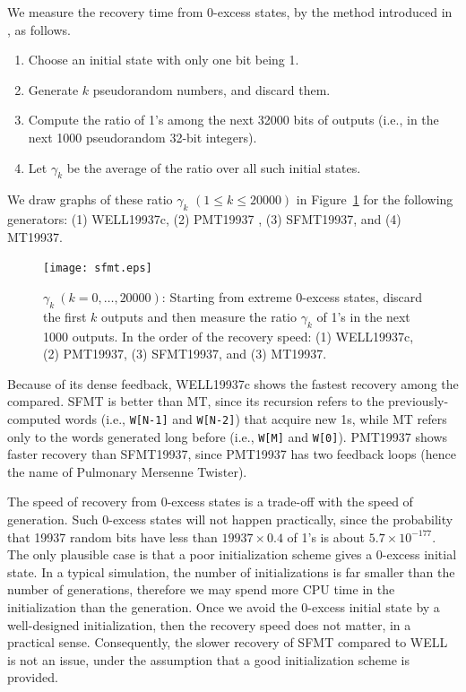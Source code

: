 \documentclass[acmnow]{acmtrans2m}
\begin{document}
We measure the recovery time from 0-excess states, 
by the method introduced in \cite{WELL}, as follows.
\begin{enumerate}
\item Choose an initial state with only one bit being 1.
\item Generate $k$ pseudorandom numbers, and discard them.
\item Compute the ratio of 1's among the 
next 32000 bits of outputs
(i.e., in the next 1000 pseudorandom 32-bit integers).
\item Let $\gamma_k$ be the average of the ratio over
all such initial states.
\end{enumerate}
We draw graphs of these ratio $\gamma_k$ $(1 \leq k \leq 20000)$
in Figure~\ref{fig:zero-recovery}
for the following generators: (1) WELL19937c, 
(2) PMT19937 \cite{PMT}, (3) SFMT19937, and (4) MT19937. 
\begin{figure}
\texttt{[image: sfmt.eps]}
\caption{$\gamma_k \ (k=0,\ldots,20000)$:
Starting from extreme 0-excess states,
discard the first $k$ outputs and then measure
the ratio $\gamma_k$ of 1's in the next 1000 outputs. 
In the order of the recovery speed: 
(1) WELL19937c, 
(2) PMT19937, (3) SFMT19937, and (3) MT19937.
}\label{fig:zero-recovery}
\end{figure}
Because of its dense feedback, WELL19937c shows
the fastest recovery among the compared. 
SFMT is better than MT, since its recursion refers to 
the previously-computed words (i.e., {\tt W[N-1]} and {\tt W[N-2]}) 
that acquire new 1s, while
MT refers only to the words generated long before 
(i.e., {\tt W[M]} and {\tt W[0]}). PMT19937 shows faster recovery 
than SFMT19937, since PMT19937 has two feedback loops
(hence the name of Pulmonary Mersenne Twister).

The speed of recovery from 0-excess states 
is a trade-off 
with the speed of generation. 
Such 0-excess states will not happen practically, 
since the probability 
that 19937 random bits have less than $19937\times 0.4$ of 1's 
is about $5.7\times 10^{-177}$.
The only plausible case is that
a poor initialization scheme gives a 0-excess initial state. 
In a typical simulation, the number of 
initializations is far smaller than the number of generations,
therefore we may spend more CPU time in the initialization
than the generation. Once we avoid the 0-excess initial state
by a well-designed initialization, then the recovery 
speed does not matter, in a practical sense. 
Consequently, the slower recovery of SFMT compared to WELL 
is not an issue, under the assumption that
a good initialization scheme is provided. 
\end{document}
